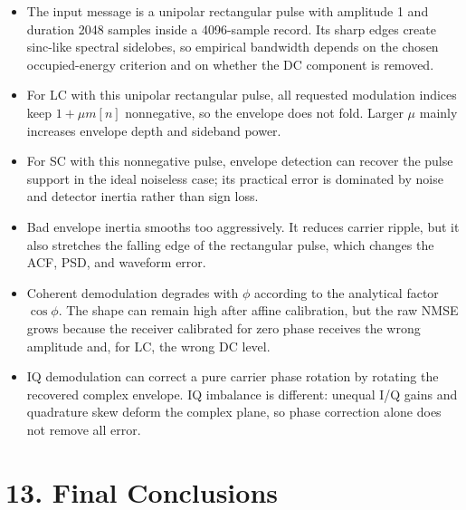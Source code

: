 \documentclass[11pt]{article}
\begin{document}
\begin{itemize}
\item The input message is a unipolar rectangular pulse with amplitude 1 and duration 2048 samples inside a 4096-sample record. Its sharp edges create sinc-like spectral sidelobes, so empirical bandwidth depends on the chosen occupied-energy criterion and on whether the DC component is removed.
\item For LC with this unipolar rectangular pulse, all requested modulation indices keep $1+\mu m[n]$ nonnegative, so the envelope does not fold. Larger $\mu$ mainly increases envelope depth and sideband power.
\item For SC with this nonnegative pulse, envelope detection can recover the pulse support in the ideal noiseless case; its practical error is dominated by noise and detector inertia rather than sign loss.
\item Bad envelope inertia smooths too aggressively. It reduces carrier ripple, but it also stretches the falling edge of the rectangular pulse, which changes the ACF, PSD, and waveform error.
\item Coherent demodulation degrades with $\phi$ according to the analytical factor $\cos\phi$. The shape can remain high after affine calibration, but the raw NMSE grows because the receiver calibrated for zero phase receives the wrong amplitude and, for LC, the wrong DC level.
\item IQ demodulation can correct a pure carrier phase rotation by rotating the recovered complex envelope. IQ imbalance is different: unequal I/Q gains and quadrature skew deform the complex plane, so phase correction alone does not remove all error.
\end{itemize}

\section{13. Final Conclusions}
\end{document}
